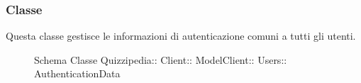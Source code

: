 \subsubsection{Classe }
Questa classe gestisce le informazioni di autenticazione comuni a tutti gli utenti.
\begin{figure}[H]
\centering
\noindent{}
\caption[Schema Classe AuthenticationData]{Schema Classe Quizzipedia:: Client:: ModelClient:: Users:: AuthenticationData}
\end{figure}
